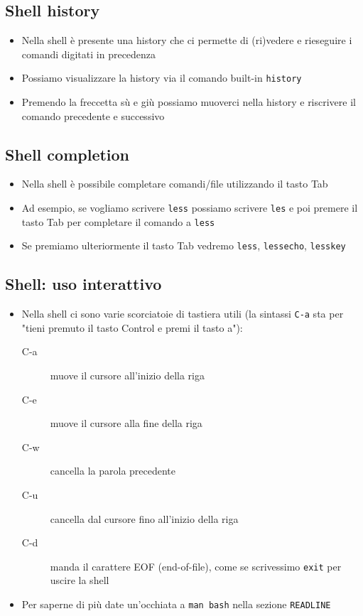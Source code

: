 \documentclass{beamer}
\newcommand{\code}[1]{\mbox{\texttt{#1}}}
\newcommand{\command}[1]{\mbox{\texttt{#1}}}
\begin{document}
\subsection*{Shell history}
\begin{frame}{\insertsubsection}
\begin{itemize}
\item Nella shell è presente una \alert{history} che ci permette di (ri)vedere e
rieseguire i comandi digitati in precedenza
\item Possiamo visualizzare la history via il comando built-in \code{history}
\item Premendo la freccetta sù e giù possiamo muoverci nella history e
riscrivere il comando precedente e successivo
\end{itemize}
\end{frame}

\subsection*{Shell completion}
\begin{frame}{\insertsubsection}
\begin{itemize}
\item Nella shell è possibile completare comandi/file utilizzando il tasto
\alert{Tab}
\item Ad esempio, se vogliamo scrivere \command{less} possiamo scrivere
\command{les} e poi premere il tasto Tab per completare il comando a
\command{less}
\item Se premiamo ulteriormente il tasto Tab vedremo \command{less},
\command{lessecho}, \command{lesskey}
\end{itemize}
\end{frame}

\subsection*{Shell: uso interattivo}
\begin{frame}{\insertsubsection}
\begin{itemize}
\item Nella shell ci sono varie scorciatoie di tastiera utili (la
sintassi \code{C-a} sta per "tieni premuto il tasto Control e
premi il tasto a"):
\begin{description}
\item[C-a] muove il cursore all'inizio della riga
\item[C-e] muove il cursore alla fine della riga
\item[C-w] cancella la parola precedente
\item[C-u] cancella dal cursore fino all'inizio della riga
\item[C-d] manda il carattere EOF (end-of-file), come se scrivessimo
\code{exit} per uscire la shell
\end{description}
\item Per saperne di più date un'occhiata a \command{man bash} nella sezione
\command{READLINE}
\end{itemize}
\end{frame}
\end{document}
